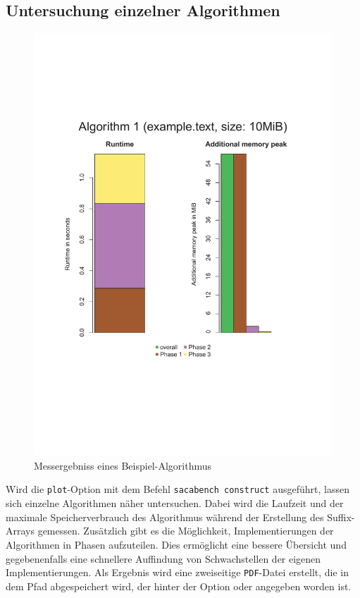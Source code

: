 \subsection{Untersuchung einzelner Algorithmen}
\label{framework:bechmark:sacabench-construct}

\begin{figure}
	\includegraphics[page = 1, width=.5\textwidth]{kapitel/framework/benchmark/sacabench-construct/beispiel_construct.pdf}
	\caption{Messergebniss eines Beispiel-Algorithmus}
	\label{pdf:benchmark:construct}
\end{figure}


Wird die \texttt{plot}-Option mit dem Befehl \texttt{sacabench construct} ausgeführt, lassen sich einzelne Algorithmen näher untersuchen. Dabei wird die Laufzeit und der maximale Speicherverbrauch des Algorithmus während der Erstellung des Suffix-Arrays gemessen. Zusätzlich gibt es die Möglichkeit, Implementierungen der Algorithmen in Phasen aufzuteilen. Dies ermöglicht eine bessere Übersicht und gegebenenfalls eine schnellere Auffindung von Schwachstellen der eigenen Implementierungen.
Als Ergebnis wird eine zweiseitige \texttt{PDF}-Datei erstellt, die in dem Pfad abgespeichert wird, der hinter der Option  oder  angegeben worden ist.

